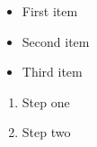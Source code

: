 \begin{itemize}
\item First item
\item Second item
\item Third item
\end{itemize}

\begin{enumerate}
\item Step one
\item Step two
\end{enumerate}
